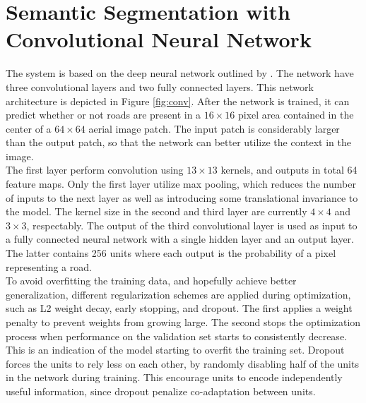 \section{Semantic Segmentation with Convolutional Neural Network}
\label{sec:network}



The system is based on the deep neural network outlined by \cite{Mnih_aerial_images_noisy}. The network have three convolutional layers and two fully connected layers. This network architecture is depicted in Figure \ref{fig:conv}. After the network is trained, it can predict whether or not roads are present in a $16 \times 16$ pixel area contained in the center of a $64 \times 64$ aerial image patch. The input patch is considerably larger than the output patch, so that the network can better utilize the context in the image. \\

The first layer perform convolution using $13 \times 13$ kernels, and outputs in total 64 feature maps. Only the first layer utilize max pooling, which reduces the number of inputs to the next layer as well as introducing some translational invariance to the model. The kernel size in the second and third layer are currently $4 \times 4$ and $3 \times 3$, respectably. The output of the third convolutional layer is used as input to a fully connected neural network with a single hidden layer and an output layer. The latter contains 256 units where each output is the probability of a pixel representing a road.\\

To avoid overfitting the training data, and hopefully achieve better generalization, different regularization schemes are applied during optimization, such as L2 weight decay, early stopping, and dropout. The first applies a weight penalty to prevent weights from growing large. The second stops the optimization process when performance on the validation set starts to consistently decrease. This is an indication of the model starting to overfit the training set. Dropout forces the units to rely less on each other, by randomly disabling half of the units in the network during training. This encourage units to encode independently useful information, since dropout penalize co-adaptation between units.\\


